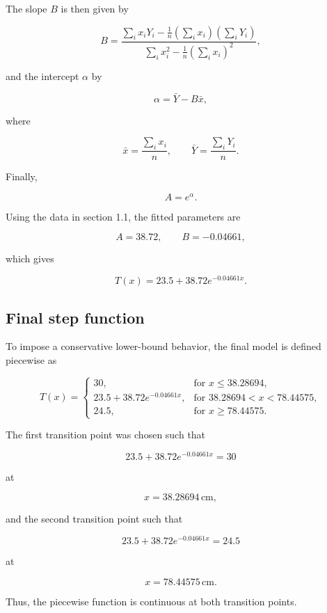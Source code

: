 \documentclass{article}
\begin{document}
The slope \(B\) is then given by

\[
B=\frac{\sum_i x_iY_i-\frac{1}{n}\left(\sum_i x_i\right)\left(\sum_i Y_i\right)}
{\sum_i x_i^2-\frac{1}{n}\left(\sum_i x_i\right)^2},
\]

and the intercept \(\alpha\) by

\[
\alpha=\bar{Y}-B\bar{x},
\]

where

\[
\bar{x}=\frac{\sum_i x_i}{n},
\qquad
\bar{Y}=\frac{\sum_i Y_i}{n}.
\]

\newpage
Finally,

\[
A=e^{\alpha}.
\]

Using the data in section 1.1, the fitted parameters are

\[
A=38.72,
\qquad
B=-0.04661,
\]

which gives

\[
T(x)=23.5+38.72e^{-0.04661x}.
\]

\subsection{Final step function}
To impose a conservative lower-bound behavior, the final model is defined piecewise as

\[
T(x)=
\begin{cases}
30, & \text{for } x\leq 38.28694,\\[6pt]
23.5+38.72e^{-0.04661x}, & \text{for } 38.28694<x<78.44575,\\[6pt]
24.5, & \text{for } x\geq 78.44575.
\end{cases}
\]

The first transition point was chosen such that

\[
23.5+38.72e^{-0.04661x}=30
\]

at

\[
x=38.28694\,\mathrm{cm},
\]

and the second transition point such that

\[
23.5+38.72e^{-0.04661x}=24.5
\]

at

\[
x=78.44575\,\mathrm{cm}.
\]

Thus, the piecewise function is continuous at both transition points.
\end{document}
